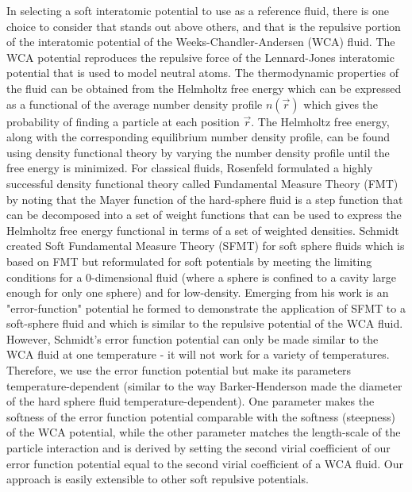 \documentclass[double,12pt]{revtex4-2}
\begin{document}
In selecting a soft interatomic potential to use as a reference fluid, 
there is one choice to consider that stands out above others, and that is 
the repulsive portion of the interatomic potential of the 
Weeks-Chandler-Andersen (WCA) fluid.
The WCA potential reproduces the repulsive force of the Lennard-Jones 
interatomic potential that is used to model neutral atoms. 
The thermodynamic properties of the fluid can be obtained from the 
Helmholtz free energy which
can be expressed as a functional of the average number 
density profile $n(\vec r)$ 
which gives the probability of finding a particle at each position $\vec r$. 
The Helmholtz free energy, along with the corresponding equilibrium number density profile,
can be found using density functional theory by 
varying the number density profile until the free energy is minimized.
For classical fluids, Rosenfeld formulated a highly successful 
density functional theory called Fundamental Measure Theory (FMT)
by noting that the Mayer function of the hard-sphere fluid is a step function
that can be decomposed into a set of weight functions that can be used 
to express the Helmholtz free energy functional in terms of a set of weighted densities. 
Schmidt created Soft Fundamental Measure Theory (SFMT) for soft sphere 
fluids which is based on FMT but reformulated for soft potentials by 
meeting the limiting conditions for a 0-dimensional fluid (where a sphere 
is confined to a cavity large enough for only one sphere) 
and for low-density. 
Emerging from his work is an "error-function" potential he formed to 
demonstrate the application of SFMT to a soft-sphere fluid and which is
similar to the repulsive potential of the WCA fluid. However, 
Schmidt's error function potential can only be made similar to the WCA fluid 
at one temperature -
it will not work for a variety of temperatures. 
Therefore, we use the error function potential but make
its parameters temperature-dependent (similar to the way Barker-Henderson made the
diameter of the hard sphere fluid temperature-dependent). 
One parameter makes the softness of the error function potential comparable 
with the softness (steepness) of the WCA potential, while the other parameter 
matches the length-scale of the particle interaction and is
derived by setting the second virial coefficient of our error function 
potential equal to the second virial coefficient of a WCA fluid. 
Our approach is easily extensible to other soft repulsive potentials.
\end{document}
